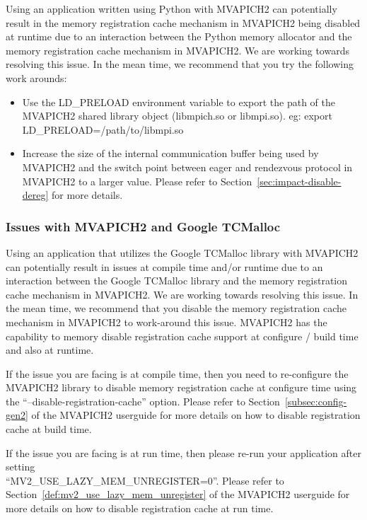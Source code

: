 Using an application written using Python with MVAPICH2 can potentially
result in the memory registration cache mechanism in MVAPICH2 being
disabled at runtime due to an interaction between the Python memory
allocator and the memory registration cache mechanism in MVAPICH2. We are
working towards resolving this issue. In the mean time, we recommend that
you try the following work arounds:

\begin{itemize}
    \item{Use the LD\_PRELOAD environment variable to export the path of
            the MVAPICH2 shared library object (libmpich.so or libmpi.so).
            eg: export LD\_PRELOAD=/path/to/libmpi.so}
    \item{Increase the size of the internal communication buffer being used
            by MVAPICH2 and the switch point between eager and rendezvous
            protocol in MVAPICH2 to a larger value. Please refer to
            Section~\ref{sec:impact-disable-dereg} for more details.}
\end{itemize}

\subsubsection{Issues with MVAPICH2 and Google TCMalloc}

Using an application that utilizes the Google TCMalloc library with
MVAPICH2 can potentially result in issues at compile time and/or runtime
due to an interaction between the Google TCMalloc library and the memory
registration cache mechanism in MVAPICH2. We are working towards resolving
this issue. In the mean time, we recommend that you disable the memory
registration cache mechanism in MVAPICH2 to work-around this issue.
MVAPICH2 has the capability to memory disable registration cache support at
configure / build time and also at runtime.

If the issue you are facing is at compile time, then you need to
re-configure the MVAPICH2 library to disable memory registration cache at
configure time using the ``--disable-registration-cache'' option. Please
refer to Section~\ref{subsec:config-gen2} of the MVAPICH2 userguide for
more details on how to disable registration cache at build time.

If the issue you are facing is at run time, then please re-run your
application after setting \\ ``MV2\_USE\_LAZY\_MEM\_UNREGISTER=0''.  Please
refer to Section~\ref{def:mv2_use_lazy_mem_unregister} of the MVAPICH2
userguide for more details on how to disable registration cache at run
time.


